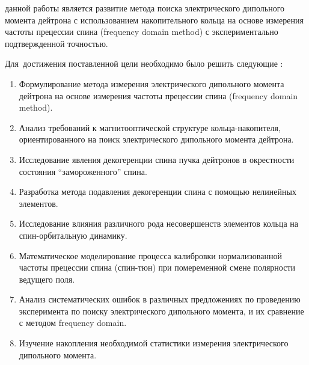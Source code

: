 

{\aim} данной работы является развитие метода поиска электрического дипольного момента дейтрона с использованием накопительного кольца на основе измерения частоты прецессии спина (frequency domain method) с экспериментально подтвержденной точностью.

Для~достижения поставленной цели необходимо было решить следующие {\tasks}:
\begin{enumerate}
	\item Формулирование метода измерения электрического дипольного момента дейтрона на основе измерения частоты прецессии спина (frequency domain method).
	\item Анализ требований к магнитооптической структуре кольца-накопителя, ориентированного на поиск электрического дипольного момента дейтрона.
	\item Исследование явления декогеренции спина пучка дейтронов в окрестности состояния ``замороженного'' спина. 
	\item Разработка метода подавления декогеренции спина с помощью нелинейных элементов.
	\item Исследование влияния различного рода несовершенств элементов кольца на спин-орбитальную динамику. 
	\item Математическое моделирование процесса калибровки нормализованной частоты прецессии спина (спин-тюн) при помеременной смене полярности ведущего поля.
	\item Анализ систематических ошибок в различных предложениях по проведению эксперимента по поиску электрического дипольного момента, и их сравнение с методом frequency domain. 
	\item Изучение накопления необходимой статистики измерения электрического дипольного момента.
\end{enumerate}

